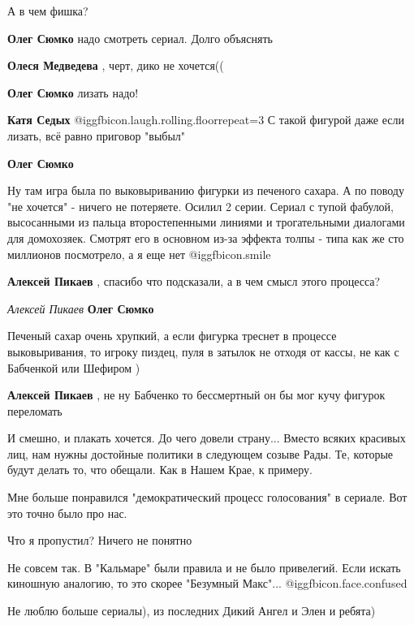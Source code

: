 \begin{itemize}
А в чем фишка?

\begin{itemize} %
\textbf{Олег Сюмко} надо смотреть сериал. Долго объяснять

\textbf{Олеся Медведева} , черт, дико не хочется((

\textbf{Олег Сюмко} лизать надо!

\textbf{Катя Седых}  @igg{fbicon.laugh.rolling.floor}{repeat=3} 
С такой фигурой даже если лизать, всё равно приговор "выбыл"

\textbf{Олег Сюмко} 

Ну там игра была по выковыриванию фигурки из печеного сахара. А по поводу "не
хочется" - ничего не потеряете. Осилил 2 серии. Сериал с тупой фабулой,
высосанными из пальца второстепенными линиями и трогательными диалогами для
домохозяек. Смотрят его в основном из-за эффекта толпы - типа как же сто
миллионов посмотрело, а я еще нет  @igg{fbicon.smile} 


\textbf{Алексей Пикаев} , спасибо что подсказали, а в чем смысл этого процесса?

\emph{Алексей Пикаев}
\textbf{Олег Сюмко} 

Печеный сахар очень хрупкий, а если фигурка треснет в процессе выковыривания,
то игроку пиздец, пуля в затылок не отходя от кассы, не как с Бабченкой или
Шефиром )

\textbf{Алексей Пикаев} , не ну Бабченко то бессмертный он бы мог кучу фигурок переломать
\end{itemize} %


И смешно, и плакать хочется. До чего довели страну... Вместо всяких красивых
лиц, нам нужны достойные политики в следующем созыве Рады. Те, которые будут
делать то, что обещали. Как в Нашем Крае, к примеру.


Мне больше понравился "демократический процесс голосования" в сериале. Вот это
точно было про нас.

Что я пропустил? Ничего не понятно

Не совсем так.
В "Кальмаре" были правила и не было привелегий.
Если искать киношную аналогию, то это скорее "Безумный Макс"... @igg{fbicon.face.confused} 

Не люблю больше сериалы), из последних Дикий Ангел и Элен и ребята)


\end{itemize}
